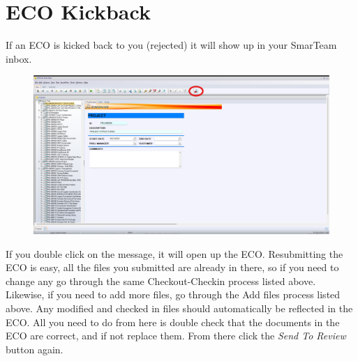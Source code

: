 \documentclass[10pt]{article}
\begin{document}
    \section{ECO Kickback}
        If an ECO is kicked back to you (rejected) it will show up in your SmarTeam inbox.
        \begin{figure}[H]
            \centerline{\includegraphics[width=\textwidth]{References/ST Inbox.png}}
        \end{figure}
        If you double click on the message, it will open up the ECO. Resubmitting the ECO is easy, all the files you submitted are already in there, so if you need to change any go through the same Checkout-Checkin process listed above. Likewise, if you need to add more files, go through the Add files process listed above. Any modified and checked in files should automatically be reflected in the ECO. All you need to do from here is double check that the documents in the ECO are correct, and if not replace them. From there click the \emph{Send To Review} button again.
\end{document}
